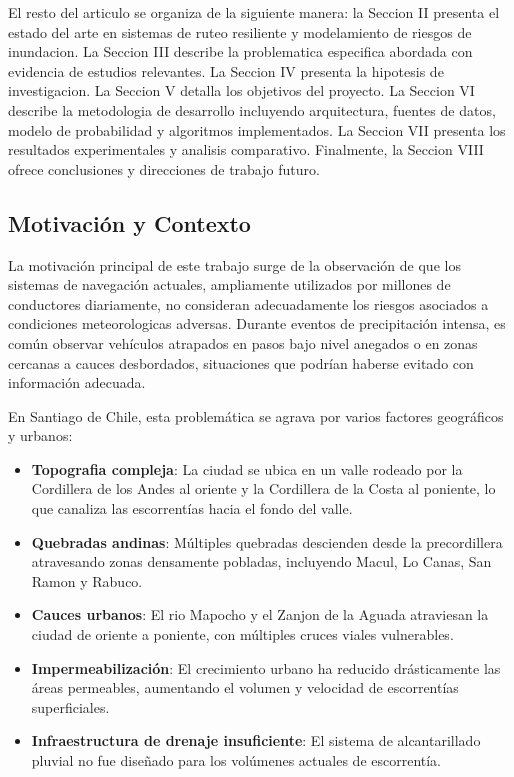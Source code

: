 \documentclass[conference]{IEEEtran}
\begin{document}
El resto del articulo se organiza de la siguiente manera: la Seccion II presenta el estado del arte en sistemas de ruteo resiliente y modelamiento de riesgos de inundacion. La Seccion III describe la problematica especifica abordada con evidencia de estudios relevantes. La Seccion IV presenta la hipotesis de investigacion. La Seccion V detalla los objetivos del proyecto. La Seccion VI describe la metodologia de desarrollo incluyendo arquitectura, fuentes de datos, modelo de probabilidad y algoritmos implementados. La Seccion VII presenta los resultados experimentales y analisis comparativo. Finalmente, la Seccion VIII ofrece conclusiones y direcciones de trabajo futuro.

\subsection{Motivación y Contexto}

La motivación principal de este trabajo surge de la observación de que los sistemas de navegación actuales, ampliamente utilizados por millones de conductores diariamente, no consideran adecuadamente los riesgos asociados a condiciones meteorologicas adversas. Durante eventos de precipitación intensa, es común observar vehículos atrapados en pasos bajo nivel anegados o en zonas cercanas a cauces desbordados, situaciones que podrían haberse evitado con información adecuada.

En Santiago de Chile, esta problemática se agrava por varios factores geográficos y urbanos:

\begin{itemize}
    \item \textbf{Topografia compleja}: La ciudad se ubica en un valle rodeado por la Cordillera de los Andes al oriente y la Cordillera de la Costa al poniente, lo que canaliza las escorrentías hacia el fondo del valle.

    \item \textbf{Quebradas andinas}: Múltiples quebradas descienden desde la precordillera atravesando zonas densamente pobladas, incluyendo Macul, Lo Canas, San Ramon y Rabuco.

    \item \textbf{Cauces urbanos}: El rio Mapocho y el Zanjon de la Aguada atraviesan la ciudad de oriente a poniente, con múltiples cruces viales vulnerables.

    \item \textbf{Impermeabilización}: El crecimiento urbano ha reducido drásticamente las áreas permeables, aumentando el volumen y velocidad de escorrentías superficiales.

    \item \textbf{Infraestructura de drenaje insuficiente}: El sistema de alcantarillado pluvial no fue diseñado para los volúmenes actuales de escorrentía.
\end{itemize}
\end{document}
